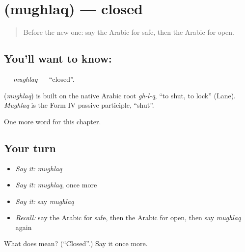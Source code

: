\section[\texorpdfstring{\ar{مغلق} (mughlaq)}{مغلق (mughlaq)}]{ (mughlaq) — closed}

\label{lesson:AR-C146-mughlaq}



\begin{quote}
Before the new one: say the Arabic for safe, then the Arabic for open.
\end{quote}

\subsection*{You'll want to know: }
\textbf{} — \emph{mughlaq} — \textquotedblleft{}closed\textquotedblright{}.

\begin{cousinweb}
\textbf{} (\emph{mughlaq}) is built on the native Arabic root \emph{gh-l-q}, \textquotedblleft{}to shut, to lock\textquotedblright{} (Lane). \emph{Mughlaq} is the Form IV passive participle, \textquotedblleft{}shut\textquotedblright{}.
\end{cousinweb}

\begin{grammarlens}[title={What you've built}]
One more word for this chapter.
\end{grammarlens}

\subsection*{Your turn}
\begin{itemize}
\raggedright
  \item \emph{Say it:} \emph{mughlaq}
  \item \emph{Say it:} \emph{mughlaq}, once more
  \item \emph{Say it:} say \emph{mughlaq}
  \item \emph{Recall:} say the Arabic for safe, then the Arabic for open, then say \emph{mughlaq} again
\end{itemize}

\begin{tcolorbox}[breakable,colback=teal!4,colframe=teal!35!black,title={Before you move on}]
What does  mean? (\textquotedblleft{}Closed\textquotedblright{}.) Say it once more.
\end{tcolorbox}
